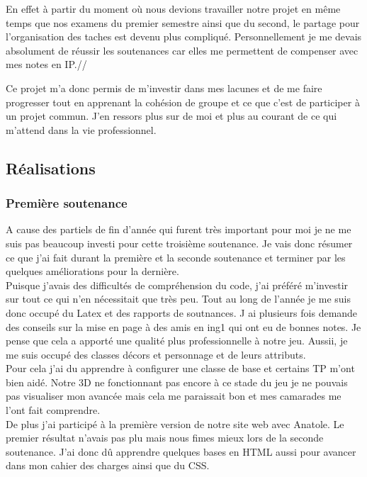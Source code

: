 \documentclass[12pt]{article}
\begin{document}
En effet à partir du moment où nous devions travailler notre projet en même  temps que nos examens du premier semestre ainsi que du second, le partage pour l’organisation des taches est devenu plus compliqué. Personnellement je me devais absolument de réussir les soutenances car elles me permettent de compenser avec mes notes en IP.//

Ce projet m’a donc permis de m’investir dans mes lacunes et de me faire progresser tout en apprenant la cohésion de groupe et ce que c’est de participer à un projet commun. J’en ressors plus sur de moi et plus au courant de ce qui m’attend dans la vie professionnel.\\

\newpage
\subsection{Réalisations}
\subsubsection{Première soutenance}

A cause des partiels de fin d’année qui furent très important pour moi je ne me suis pas beaucoup investi pour cette troisième soutenance. Je vais donc résumer ce que j’ai fait durant la première et la seconde soutenance et terminer par les quelques améliorations pour la dernière.\\

Puisque j’avais des difficultés de compréhension du code, j’ai préféré m’investir sur tout ce qui n’en nécessitait que très peu. Tout au long de l'année je me suis donc occupé du Latex et des rapports de soutnances. J ai plusieurs fois demande des conseils sur la mise en page à des amis en ing1 qui ont eu de bonnes notes. Je pense que cela a apporté une qualité plus professionnelle à notre jeu. Aussii, je me suis occupé des classes décors et personnage et de leurs attributs.\\ 

 Pour cela j'ai du apprendre à configurer une classe de base et certains TP m'ont bien aidé. Notre 3D ne fonctionnant pas encore à ce stade du jeu je ne pouvais pas visualiser mon avancée mais cela me paraissait bon et mes camarades me l’ont fait comprendre.\\

De plus j’ai participé à la première version de notre site web avec Anatole. Le premier résultat n'avais pas plu mais nous fimes mieux lors de la seconde soutenance. J’ai donc dû apprendre quelques bases en HTML aussi pour avancer dans mon cahier des charges ainsi que du CSS.\\
\end{document}
